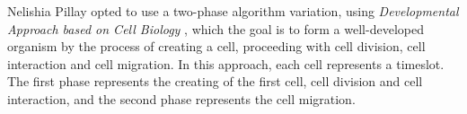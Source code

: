 Nelishia Pillay opted to use a two-phase algorithm variation, using \textit{Developmental Approach based on Cell Biology} \cite{Pillay2007}, which the goal is to form a well-developed organism by the process of creating a cell, proceeding with cell division, cell interaction and cell migration. In this approach, each cell represents a timeslot. The first phase represents the creating of the first cell, cell division and cell interaction, and the second phase represents the cell migration.





